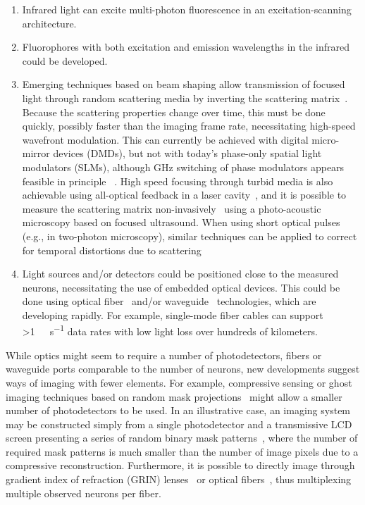 \begin{enumerate}
\item Infrared light can excite multi-photon fluorescence in an excitation-scanning architecture.
\item Fluorophores with both excitation and emission wavelengths in the infrared could be developed.
\item Emerging techniques based on beam shaping allow transmission of focused light through random scattering media by inverting the scattering matrix~\cite{conkey12}.
Because the scattering properties change over time, this must be done quickly, possibly faster than the imaging frame rate, necessitating high-speed wavefront modulation.
This can currently be achieved with digital micro-mirror devices (DMDs), but not with today's phase-only spatial light modulators (SLMs), although GHz switching of phase modulators appears feasible in principle ~\cite{alivisatos13}. High speed focusing through turbid media is also achievable using all-optical feedback in a laser cavity~\cite{Nixon2013}, and it is possible to measure the scattering matrix non-invasively~\cite{Chaigne2013} using a photo-acoustic microscopy based on focused ultrasound. When using short optical pulses (e.g., in two-photon microscopy), similar techniques can be applied to correct for temporal distortions due to scattering \cite{mccabe2011spatio, katz2011focusing}
\item Light sources and/or detectors could be positioned close to the measured neurons, necessitating the use of embedded optical devices.
This could be done using optical fiber~\cite{mahalati13} and/or waveguide~\cite{zorzos10,zorzos12} technologies, which are developing rapidly.
For example, single-mode fiber cables can support \SI{>1}{\tera\byte\per\second} data rates with low light loss over hundreds of kilometers.
\end{enumerate}

While optics might seem to require a number of photodetectors, fibers or waveguide ports comparable to the number of neurons, new developments suggest ways of imaging with fewer elements.
For example, compressive sensing or ghost imaging techniques based on random mask projections~\cite{wakin06,studer12,tian11,sun13} might allow a smaller number of photodetectors to be used.
In an illustrative case, an imaging system may be constructed simply from a single photodetector and a transmissive LCD screen presenting a series of random binary mask patterns~\cite{huang13}, where the number of required mask patterns is much smaller than the number of image pixels due to a compressive reconstruction.
Furthermore, it is possible to directly image through gradient index of refraction (GRIN) lenses~\cite{murray12} or optical fibers~\cite{mahalati13,kang10,flusberg05}, thus multiplexing multiple observed neurons per fiber.

